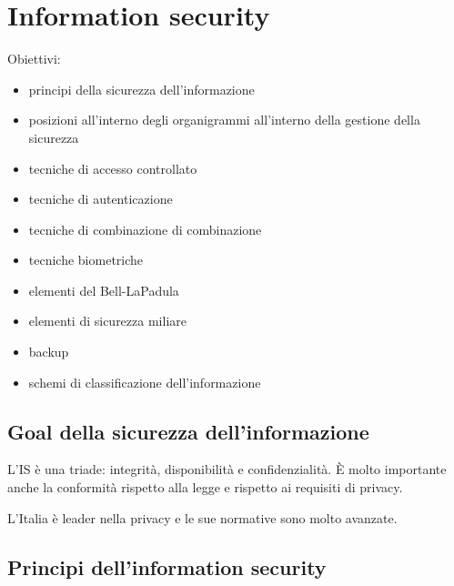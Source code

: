 \chapter{Information security}

Obiettivi:
\begin{itemize}
\item principi della sicurezza dell'informazione
\item posizioni all'interno degli organigrammi all'interno della gestione della sicurezza
\item tecniche di accesso controllato
\item tecniche di autenticazione
\item tecniche di combinazione di combinazione
\item tecniche biometriche
\item elementi del Bell-LaPadula
\item elementi di sicurezza miliare
\item backup
\item schemi di classificazione dell'informazione
\end{itemize}

\section{Goal della sicurezza dell'informazione}

L'IS è una triade: integrità, disponibilità e confidenzialità. È molto
importante anche la conformità rispetto alla legge e rispetto ai requisiti di 
privacy.

L'Italia è leader nella privacy e le sue normative sono molto avanzate.


\section{Principi dell'information security}

